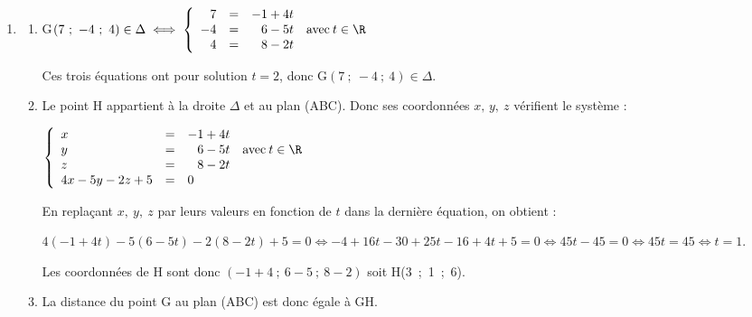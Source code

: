 \begin{enumerate}
\begin{enumerate}
D'après la question précédente on sait que :

$M(x~;~y~;~z) \in (\text{ABC}) \iff 4x - 5y - 2z + d = 0$ avec $d \in \R$

Or A$(- 1~;~-1~;~3) \in (\text{ABC})$ donc $4\times (-1) - 5\times (-1)  - 2\times 3  + d = 0$ avec $d \in \R$, soit $- 5 + d = 0 \iff d = 5$.

Conclusion : $M(x~;~y~;~z) \in (\text{ABC}) \iff 4x - 5y - 2z + 5 = 0$.
	\end{enumerate}
\item
	\begin{enumerate}
		\item %
		G$(7~;~-4~;~4) \in \Delta \iff \left\{\begin{array}{r c l}
7 &=& -1 + 4t\\
-4 &=& \phantom{-}6 - 5t \quad\text{avec}\: t \in \R\\
4 &=& \phantom{-}8 - 2t
\end{array}\right.$

Ces trois équations ont pour solution $t = 2$, donc G$(7~;~-4~;~4) \in \Delta$.
		\item %
Le point H appartient à la droite $\Delta$ et au plan (ABC). Donc ses coordonnées $x,\,y,\:z$ vérifient le système :

$\left\{\begin{array}{l c l}
x &=& -1 + 4t\\
y &=& \phantom{-}6 - 5t \quad\text{avec}\: t \in \R\\
z &=& \phantom{-}8 - 2t\\
4x - 5y - 2z + 5 &=& 0
\end{array}\right.$

En replaçant $x,\:y,\: z$ par leurs valeurs en fonction de $t$ dans la dernière équation, on obtient :

$4(- 1 + 4t) - 5(6 - 5t) - 2(8 - 2t) + 5 = 0\iff -4 + 16t - 30 + 25t - 16 + 4t + 5 = 0\iff 45t -45 = 0 \iff 45t = 45 \iff t = 1$.

Les coordonnées de H sont donc $(-1 + 4~;~6 - 5~;~8 - 2)$ soit H(3~;~1~;~6).
		\item %
		
		La distance du point G au plan (ABC) est donc égale à GH.
		

\end{enumerate}
\end{enumerate}
